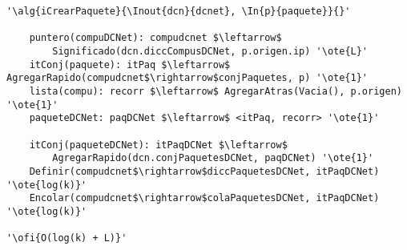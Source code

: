 \begin{lstlisting}[mathescape]
'\alg{iCrearPaquete}{\Inout{dcn}{dcnet}, \In{p}{paquete}}{}'
	
	puntero(compuDCNet): compudcnet $\leftarrow$ 
		Significado(dcn.diccCompusDCNet, p.origen.ip) '\ote{L}'	
	itConj(paquete): itPaq $\leftarrow$ AgregarRapido(compudcnet$\rightarrow$conjPaquetes, p) '\ote{1}'
	lista(compu): recorr $\leftarrow$ AgregarAtras(Vacia(), p.origen) '\ote{1}'
	paqueteDCNet: paqDCNet $\leftarrow$ <itPaq, recorr> '\ote{1}'

	itConj(paqueteDCNet): itPaqDCNet $\leftarrow$ 
		AgregarRapido(dcn.conjPaquetesDCNet, paqDCNet) '\ote{1}'
	Definir(compudcnet$\rightarrow$diccPaquetesDCNet, itPaqDCNet) '\ote{log(k)}'
	Encolar(compudcnet$\rightarrow$colaPaquetesDCNet, itPaqDCNet) '\ote{log(k)}'

'\ofi{O(log(k) + L)}'
\end{lstlisting}

